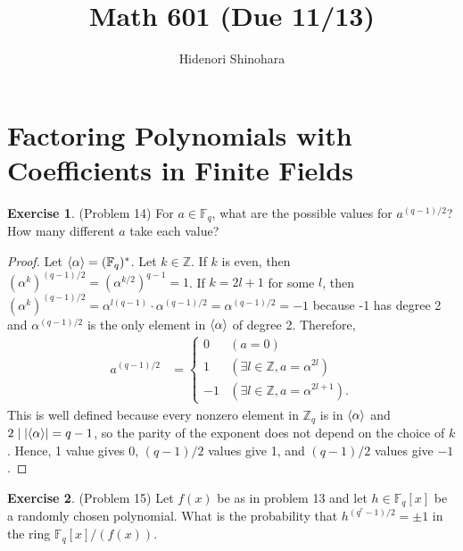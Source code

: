 \documentclass[12pt, psamsfonts]{amsart}
\theoremstyle{definition}
\newtheorem*{exer}{Exercise}
\theoremstyle{remark}
\numberwithin{equation}{section}
\begin{document}
\title{Math 601 (Due 11/13)}
\author{Hidenori Shinohara}
\maketitle

\tableofcontents

\section{Factoring Polynomials with Coefficients in Finite Fields}

\begin{exer}{(Problem 14)}
  For $a \in \mathbb{F}_q$, what are the possible values for $a^{(q - 1)/2}$?
  How many different $a$ take each value?
\end{exer}

\begin{proof}
  Let $\ev{\alpha} = (\mathbb{F}_q)^*$.
  Let $k \in \mathbb{Z}$.
  If $k$ is even, then $(\alpha^{k})^{(q - 1)/2} = (\alpha^{k/2})^{q - 1} = 1$.
  If $k = 2l + 1$ for some $l$, then $(\alpha^{k})^{(q - 1)/2} = \alpha^{l(q - 1)}\cdot\alpha^{(q - 1)/2} = \alpha^{(q - 1) / 2} = -1$ because -1 has degree 2 and $\alpha^{(q - 1)/2}$ is the only element in $\ev{\alpha}$ of degree 2.
  Therefore, 
  \begin{align*}
    a^{(q - 1) / 2} &= \begin{cases}
      0 & (a = 0) \\
      1 & (\exists l \in \mathbb{Z}, a = \alpha^{2l}) \\
      -1 & (\exists l \in \mathbb{Z}, a = \alpha^{2l + 1}).
    \end{cases}
  \end{align*}
  This is well defined because every nonzero element in $\mathbb{Z}_q$ is in $\ev{\alpha}$ and $2 \mid \abs{\ev{\alpha}} = q - 1$, so the parity of the exponent does not depend on the choice of $k$.
  Hence, 1 value gives 0, $(q - 1)/2$ values give 1, and $(q - 1) / 2$ values give $-1$.
\end{proof}

\begin{exer}{(Problem 15)}
  Let $f(x)$ be as in problem 13 and let $h \in \mathbb{F}_q[x]$ be a randomly chosen polynomial.
  What is the probability that $h^{(q^r - 1)/2} = \pm 1$ in the ring $\mathbb{F}_q[x]/(f(x))$.
\end{exer}
\end{document}
